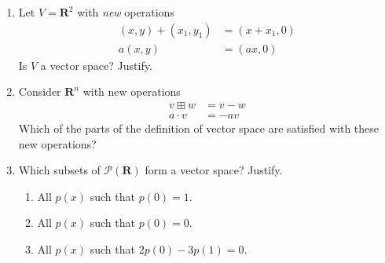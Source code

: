 \documentclass[12pt]{article}
\begin{document}
\begin{enumerate}
\item Let $V = \mathbf{R}^2$ with \emph{new} operations
\begin{align*}
    (x,y)+(x_1,y_1) &= (x+x_1,0) \\
    a(x,y) &=(ax,0)
\end{align*}
Is $V$ a vector space?  Justify.

\item Consider $\mathbf{R}^n$ with new operations
\begin{align*}
    v \boxplus w &= v-w \\
    a \cdot v &= -a v
\end{align*}
Which of the parts of the definition of vector space are satisfied with these new operations?

\item Which subsets of $\mathcal{P}(\mathbf{R})$ form a vector space?  Justify.
    \begin{enumerate}
    \item All $p(x)$ such that $p(0)=1$.
    \item All $p(x)$ such that $p(0)=0$.
    \item All $p(x)$ such that $2p(0)-3p(1)=0$.
    \end{enumerate}


\end{enumerate}
\end{document}
